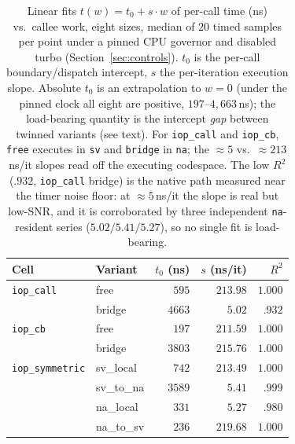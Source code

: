 \documentclass[conference]{IEEEtran}
\newcommand{\code}[1]{\texttt{#1}}
\begin{document}
\begin{table}[t]
\caption{Linear fits $t(w)=t_0+s\cdot w$ of per-call time (ns) vs.\ callee work,
eight sizes, median of $20$ timed samples per point under a pinned CPU governor
and disabled turbo (Section~\ref{sec:controls}). $t_0$ is the per-call
boundary/dispatch intercept, $s$ the per-iteration execution slope. Absolute
$t_0$ is an extrapolation to $w{=}0$ (under the pinned clock all eight are
positive, $197$--$4{,}663$\,ns); the load-bearing quantity is the intercept
\emph{gap} between twinned variants (see text). For \code{iop\_call} and
\code{iop\_cb}, \code{free} executes in \code{sv} and \code{bridge} in
\code{na}; the $\approx$$5$ vs.\ $\approx$$213$\,ns/it slopes read off the
executing codespace. The low $R^2$ ($.932$, \code{iop\_call} bridge) is the
native path measured near the timer noise floor: at $\approx$$5$\,ns/it the
slope is real but low-SNR, and it is corroborated by three independent
\code{na}-resident series ($5.02/5.41/5.27$), so no single fit is load-bearing.}
\label{tab:fits}
\centering
\footnotesize
\setlength{\tabcolsep}{4pt}
\begin{tabular}{@{}llrrr@{}}
\toprule
Cell & Variant & $t_0$ (ns) & $s$ (ns/it) & $R^2$ \\
\midrule
\code{iop\_call} & free    & $595$  & $213.98$ & $1.000$ \\
                 & bridge  & $4663$ & $5.02$   & $.932$  \\
\midrule
\code{iop\_cb}   & free    & $197$  & $211.59$ & $1.000$ \\
                 & bridge  & $3803$ & $215.76$ & $1.000$ \\
\midrule
\code{iop\_symmetric} & sv\_local  & $742$   & $213.49$ & $1.000$ \\
                      & sv\_to\_na & $3589$  & $5.41$   & $.999$  \\
                      & na\_local  & $331$   & $5.27$   & $.980$  \\
                      & na\_to\_sv & $236$   & $219.68$ & $1.000$ \\
\bottomrule
\end{tabular}
\end{table}
\end{document}

